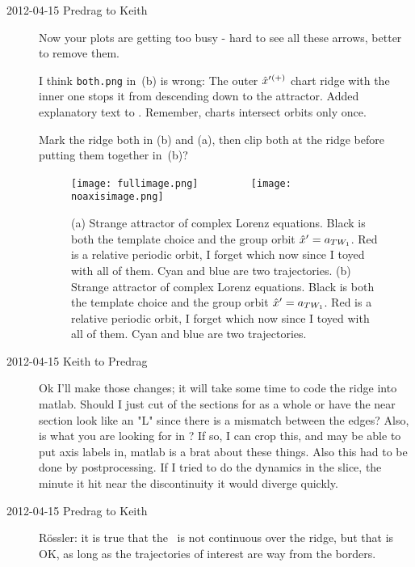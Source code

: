 \begin{description}
\item[2012-04-15 Predrag to Keith] Now your plots are getting too busy -
hard to see all these arrows, better to remove them.

I think
\texttt{both.png} in \,(b) is wrong: The outer
${\hat{x}'}{}^{(+)}$ chart ridge with the inner one stops it from descending
down to the attractor. Added explanatory text to .
Remember, charts intersect orbits only once.

Mark the ridge both in (b) and
(a), then clip both at the ridge before putting them
together in \,(b)?

 \begin{figure}[H]
 \begin{center}
\texttt{[image: fullimage.png]}%
~~~~~~~~
\texttt{[image: noaxisimage.png]}%
 \end{center}
 \caption{
(a)
Strange attractor of complex Lorenz equations.  Black is both the
template choice and the group orbit ${\hat{x}'} = a_{TW_{1}}$.  Red
is a relative periodic orbit, I forget which now since I toyed with all
of them.  Cyan and blue are two trajectories.
(b)
Strange attractor of complex Lorenz equations.  Black is both the
template choice and the group orbit ${\hat{x}'} = a_{TW_{1}}$.  Red
is a relative periodic orbit, I forget which now since I toyed with all
of them.  Cyan and blue are two trajectories.
    }{\label{fig:reducedspace}}
 \end{figure}

\item[2012-04-15 Keith to Predrag]  Ok I'll make those changes; it will
take some time to code the ridge into matlab. Should I just cut of the
sections for as a whole or have the near section look like an "L" since
there is a mismatch between the edges?  Also, is
 what you are looking for in
?  If so, I can crop this, and may be able to put
axis labels in, matlab is a brat about these things. Also this had to be
done by postprocessing.  If I tried to do the dynamics in the slice, the
minute it hit near the discontinuity it would diverge quickly.

\item[2012-04-15 Predrag to Keith] R\"ossler: it is true that the
\PoincBord\ is not continuous over the ridge, but that is OK, as long as
the trajectories of interest are way from the borders.



\end{description}
